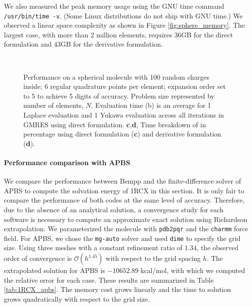 We also measured the peak memory usage using the GNU time command \texttt{/usr/bin/time -v}. (Some Linux distributions do not ship with GNU time.)
We observed a linear space complexity as shown in Figure \ref{fig:sphere_memory}.
The largest case, with more than $2$ million elements, requires $36$GB for the direct formulation and $43$GB for the derivative formulation.

\begin{figure*}[t]
\centering
    \\
    \caption{Performance on a spherical molecule with 100 random charges inside;
    6 regular quadrature points per element; \fmm expansion order set to 5 to achieve 5 digits of accuracy. Problem size represented by number of elements, $N$. Evaluation time (b) is an average for 1 Laplace \fmm evaluation and 1 Yukawa \fmm evaluation across all iterations in GMRES using direct formulation.
    \textbf{c},\textbf{d}, Time breakdown of \gmres in percentage using direct formulation (\textbf{c}) and derivative formulation (\textbf{d}).}
\end{figure*}

\paragraph{Performance comparison with APBS} \label{result_comparison_apbs}
We compare the performance between Bempp and the finite-difference solver of APBS to compute the solvation energy of 1RCX in this section.
It is only fair to compare the performance of both codes at the same level of accuracy.
Therefore, due to the absence of an analytical solution, a convergence study for each software is necessary to compute an approximate exact solution using Richardson extrapolation.
We parameterized the molecule with \texttt{pdb2pqr} and the \texttt{charmm} force field. 
For APBS, we chose the \texttt{mg-auto} solver and used \texttt{dime} to specify the grid size.
Using three meshes with a constant refinement ratio of $1.34$, the observed order of convergence is $\mathcal{O}(h^{1.45})$ with respect to the grid spacing $h$.
The extrapolated solution for APBS is $-10652.89$ kcal/mol, with which we computed the relative error for each case.
These results are summarized in Table \ref{tab:1RCX_apbs}.
The memory cost grows linearly and the time to solution grows quadratically with respect to the grid size.

